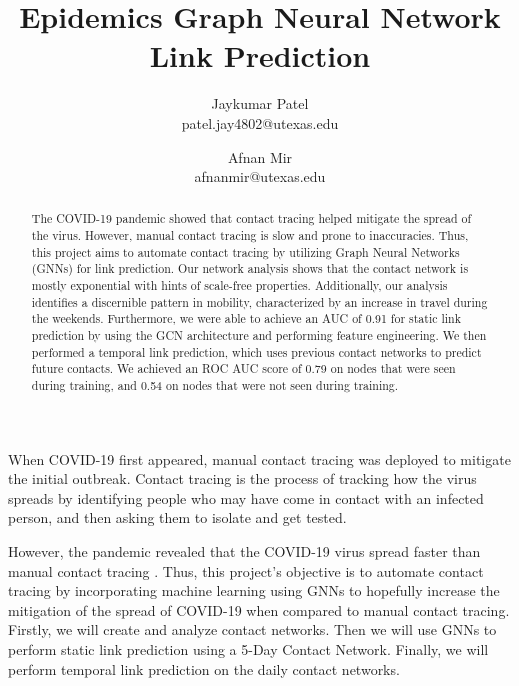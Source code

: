 \documentclass[times, 10pt,twocolumn]{article}
\begin{document}
\title{Epidemics Graph Neural Network Link Prediction}

\author{Jaykumar Patel\\
patel.jay4802@utexas.edu\\
\and
Afnan Mir\\
afnanmir@utexas.edu\\
}

\maketitle
\thispagestyle{empty}

\begin{abstract}
The COVID-19 pandemic showed that contact tracing helped mitigate the spread of the virus. However, manual contact tracing is slow and prone to inaccuracies. Thus, this project aims to automate contact tracing by utilizing Graph Neural Networks (GNNs) for link prediction. Our network analysis shows that the contact network is mostly exponential with hints of scale-free properties. Additionally, our analysis identifies a discernible pattern in mobility, characterized by an increase in travel during the weekends. Furthermore, we were able to achieve an AUC of 0.91 for static link prediction by using the GCN architecture and performing feature engineering. We then performed a temporal link prediction, which uses previous contact networks to predict future contacts. We achieved an ROC AUC score of 0.79 on nodes that were seen during training, and 0.54 on nodes that were not seen during training.
\end{abstract}



When COVID-19 first appeared, manual contact tracing was deployed to mitigate the initial outbreak. Contact tracing is the process of tracking how the virus spreads by identifying people who may have come in contact with an infected person, and then asking them to isolate and get tested.

However, the pandemic revealed that the COVID-19 virus spread faster than manual contact tracing \cite{flaxman2020estimating}. Thus, this project's objective is to automate contact tracing by incorporating machine learning using GNNs to hopefully increase the mitigation of the spread of COVID-19 when compared to manual contact tracing. Firstly, we will create and analyze contact networks. Then we will use GNNs to perform static link prediction using a 5-Day Contact Network. Finally, we will perform temporal link prediction on the daily contact networks.
\end{document}
